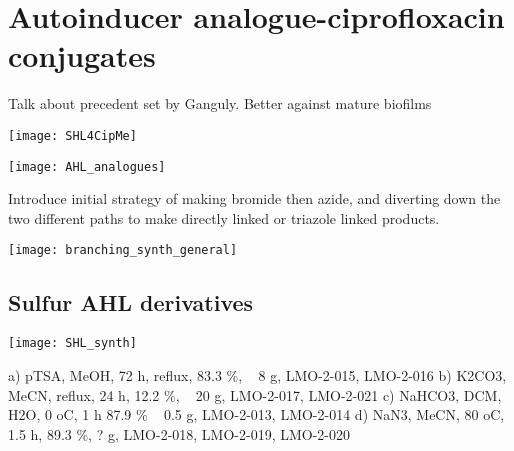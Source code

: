\section{Autoinducer analogue-ciprofloxacin conjugates}

Talk about precedent set by Ganguly.
Better against mature biofilms

\begin{scheme}[H]
	\begin{center}
		\texttt{[image: SHL4CipMe]}
		\caption{\label{sch:}}
	\end{center}
\end{scheme}

\begin{scheme}[H]
	\begin{center}
		\texttt{[image: AHL\_analogues]}
		\caption{\label{sch:}}
	\end{center}
\end{scheme}

Introduce initial strategy of making bromide then azide, and diverting down the two different paths to make directly linked or triazole linked products.

\begin{scheme}[H]
	\begin{center}
		\texttt{[image: branching\_synth\_general]}
		\caption{\label{sch:}}
	\end{center}
\end{scheme}



\subsection{Sulfur AHL derivatives}

\begin{scheme}[H]
	\begin{center}
		\texttt{[image: SHL\_synth]}
		\caption{a) pTSA, MeOH, 72 h, reflux, 83.3 \%, ~ 8 g, LMO-2-015, LMO-2-016
			b) K2CO3, MeCN, reflux, 24 h, 12.2 \%, ~ 20 g, LMO-2-017, LMO-2-021
			c) NaHCO3, DCM, H2O, 0 oC, 1 h 87.9 \% ~ 0.5 g, LMO-2-013, LMO-2-014
			d) NaN3, MeCN, 80 oC, 1.5 h, 89.3 \%, ? g, LMO-2-018, LMO-2-019, LMO-2-020\label{sch:}}
	\end{center}
\end{scheme}

